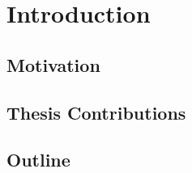 \chapter{Introduction}

\section{Motivation}

\section{Thesis Contributions}


\section{Outline}


    